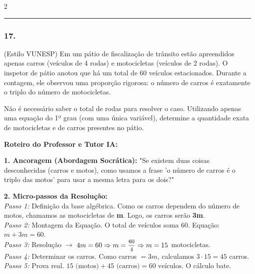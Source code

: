 \begin{multicols*}{2}
\par\vspace{\espacoQuestao}


\noindent\textcolor{CorLinha}{\rule{\linewidth}{0.5pt}} 
\par\vspace{\espacoPreQuestao}
\subsubsection*{17.} 
\begin{enunciadoLiteral}
(Estilo VUNESP) Em um pátio de fiscalização de trânsito estão apreendidos apenas carros (veículos de 4 rodas) e motocicletas (veículos de 2 rodas). O inspetor de pátio anotou que há um total de 60 veículos estacionados. Durante a contagem, ele observou uma proporção rigorosa: o número de carros é exatamente o triplo do número de motocicletas.

Não é necessário saber o total de rodas para resolver o caso. Utilizando apenas uma equação do 1º grau (com uma única variável), determine a quantidade exata de motocicletas e de carros presentes no pátio.
\end{enunciadoLiteral}

\ifgabarito
    \begin{tcolorbox}[colback=CorTitUm!5, colframe=CorTitUm, boxrule=1pt, arc=4pt, left=6pt, right=6pt, top=6pt, bottom=6pt]
    \small\textbf{\textcolor{CorTitUm}{Roteiro do Professor e Tutor IA:}}\par\vspace{0.1cm}
    \color{CinzaEscuro}
    \textbf{1. Ancoragem (Abordagem Socrática):} "Se existem duas coisas desconhecidas (carros e motos), como usamos a frase 'o número de carros é o triplo das motos' para usar a mesma letra para os dois?"\par\vspace{0.1cm}
    
    \textbf{2. Micro-passos da Resolução:}\\
    \textit{Passo 1:} Definição da base algébrica. Como os carros dependem do número de motos, chamamos as motocicletas de \textbf{m}. Logo, os carros serão \textbf{3m}.\\
    \textit{Passo 2:} Montagem da Equação. O total de veículos soma 60. Equação: $m + 3m = 60$.\\
    \textit{Passo 3:} Resolução $\rightarrow$ $4m = 60 \Rightarrow m = \mfrac{60}{4} \Rightarrow m = 15$ motocicletas.\\
    \textit{Passo 4:} Determinar os carros. Como carros $= 3m$, calculamos $3 \cdot 15 = 45$ carros.\\
    \textit{Passo 5:} Prova real. $15 \text{ (motos)} + 45 \text{ (carros)} = 60 \text{ veículos}$. O cálculo bate.\par\vspace{0.1cm}
    

\end{tcolorbox}
\end{multicols*}
